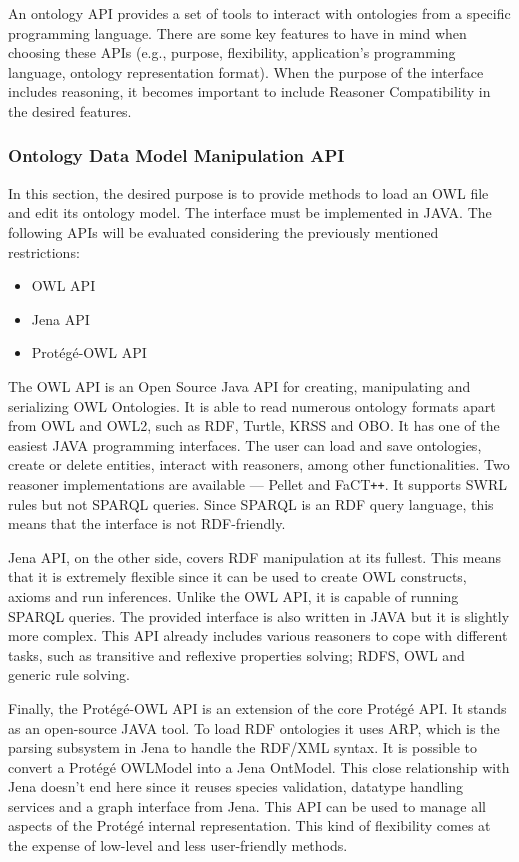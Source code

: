 An ontology API provides a set of tools to interact with ontologies from a specific programming language. There are some key features to have in mind when choosing these APIs (e.g., purpose, flexibility, application's programming language, ontology representation format). When the purpose of the interface includes reasoning, it becomes important to include Reasoner Compatibility in the desired features.

\subsubsection{Ontology Data Model Manipulation API}

In this section, the desired purpose is to provide methods to load an OWL file and edit its ontology model. The interface must be implemented in JAVA. The following APIs will be evaluated considering the previously mentioned restrictions:
\begin{itemize}
	\item OWL API
	\item Jena API
	\item Protégé-OWL API
\end{itemize}

The OWL API is an Open Source Java API for creating, manipulating and serializing OWL Ontologies. It is able to read numerous ontology formats apart from OWL and OWL2, such as RDF, Turtle, KRSS and OBO. It has one of the easiest JAVA programming interfaces. The user can load and save ontologies, create or delete entities, interact with reasoners, among other functionalities. Two reasoner implementations are available --- Pellet and FaCT\texttt{++}. It supports SWRL rules but not SPARQL queries. Since SPARQL is an RDF query language, this means that the interface is not RDF-friendly.

Jena API, on the other side, covers RDF manipulation at its fullest. This means that it is extremely flexible since it can be used to create OWL constructs, axioms and run inferences. Unlike the OWL API, it is capable of running SPARQL queries. The provided interface is also written in JAVA but it is slightly more complex. This API already includes various reasoners to cope with different tasks, such as transitive and reflexive properties solving; RDFS, OWL and generic rule solving.

Finally, the Protégé-OWL API is an extension of the core Protégé API. It stands as an open-source JAVA tool. To load RDF ontologies it uses ARP, which is the parsing subsystem in Jena to handle the RDF/XML syntax. It is possible to convert a Protégé OWLModel into a Jena OntModel. This close relationship with Jena doesn't end here since it reuses species validation, datatype handling services and a graph interface from Jena. This API can be used  to manage all aspects of the Protégé internal representation. This kind of flexibility comes at the expense of low-level and less user-friendly methods.

